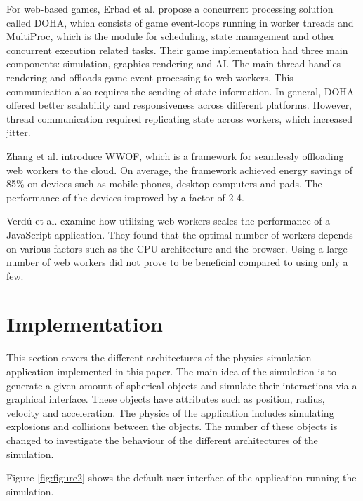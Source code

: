 \documentclass[conference]{IEEEtran}
\begin{document}
For web-based games, Erbad et al. \cite{doha} propose a concurrent processing solution called DOHA, which consists of game event-loops running in worker threads and MultiProc, which is the module for scheduling, state management and other concurrent execution related tasks. Their game implementation had three main components: simulation, graphics rendering and AI. The main thread handles rendering and offloads game event processing to web workers. This communication also requires the sending of state information. In general, DOHA offered better scalability and responsiveness across different platforms. However, thread communication required replicating state across workers, which increased jitter.

Zhang et al. \cite{zhang} introduce WWOF, which is a framework for seamlessly offloading web workers to the cloud. On average, the framework achieved energy savings of 85\% on devices such as mobile phones, desktop computers and pads. The performance of the devices improved by a factor of 2-4.

Verdú et al. \cite{verdu} examine how utilizing web workers scales the performance of a JavaScript application. They found that the optimal number of workers depends on various factors such as the CPU architecture and the browser. Using a large number of web workers did not prove to be beneficial compared to using only a few.

\section{Implementation}
\label{sec:implementation}

This section covers the different architectures of the physics simulation application implemented in this paper. The main idea of the simulation is to generate a given amount
of spherical objects and simulate their interactions via a graphical interface. These objects have attributes such as position, radius, velocity and acceleration. The 
physics of the application includes simulating explosions and collisions between the objects. The number of these objects is changed to investigate the behaviour
of the different architectures of the simulation.

Figure \ref{fig:figure2} shows the default user interface of the application running the simulation.
\end{document}
